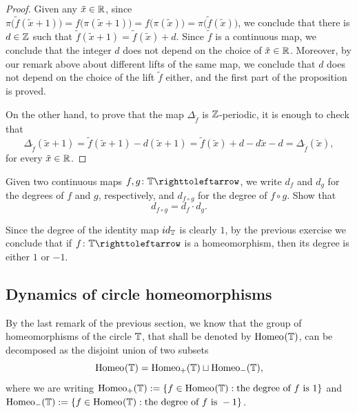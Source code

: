 \begin{proof}
  Given any $\tilde x\in\mathbb{R}$, since $\pi\big(\tilde f(\tilde x+1)\big)=f\big(\pi(\tilde x+1)\big)=f\big(\pi(\tilde x)\big)=\pi\big(\tilde f(\tilde x)\big)$, we conclude that there is $d\in\mathbb{Z}$ such that $\tilde f(\tilde x+1)=\tilde f(\tilde x)+d$. Since $\tilde f$ is a continuous map, we conclude that the integer $d$ does not depend on the choice of $\tilde x\in\mathbb{R}$. Moreover, by our remark above about different lifts of the same map, we conclude that $d$ does not depend on the choice of the lift $\tilde f$ either, and the first part of the proposition is proved.

  On the other hand, to prove that the map $\Delta_{\tilde f}$ is $\mathbb{Z}$-periodic, it is enough to check that
  \begin{displaymath}
    \Delta_{\tilde f}(\tilde x+1)=\tilde f(\tilde x+1)-d(\tilde x+1)=\tilde f(\tilde x)+d-d\tilde x-d=\Delta_{\tilde f}(\tilde x),
  \end{displaymath}
  for every $\tilde x\in\mathbb{R}$.
\end{proof}

\begin{exercise}
  Given two continuous maps $f,g\colon\T\carr$, we write $d_f$ and $d_g$ for the degrees of $f$ and $g$, respectively, and $d_{f\circ g}$ for the degree of $f\circ g$. Show that
  \begin{displaymath}
    d_{f\circ g}=d_f\cdot d_g.
  \end{displaymath}
\end{exercise}

Since the degree of the identity map $id_{\mathbb{T}}$ is clearly $1$, by the previous exercise we conclude that if $f\colon\T\carr$ is a homeomorphism, then its degree is either $1$ or $-1$.



\subsection{Dynamics of circle homeomorphisms}
\label{sec:dynam-circle-homeos}

By the last remark of the previous section, we know that the group of homeomorphisms of the circle $\mathbb{T}$, that shall be denoted by $\mathrm{Homeo}_{}(\mathbb{T})$, can be decomposed as the disjoint union of two subsets
\begin{displaymath}
  \mathrm{Homeo}_{}(\mathbb{T})=\mathrm{Homeo}_{+}(\mathbb{T})\sqcup\mathrm{Homeo}_{-}(\mathbb{T}),
\end{displaymath}
where we are writing $\mathrm{Homeo}_{+}(\mathbb{T}):=\{f\in\mathrm{Homeo}_{}(\mathbb{T}) : \text{the degree of } f \text{ is } 1\}$ and $\mathrm{Homeo}_{-}(\mathbb{T}):=\{f\in\mathrm{Homeo}_{}(\mathbb{T}) : \text{the degree of } f \text{ is } -1\}$.

